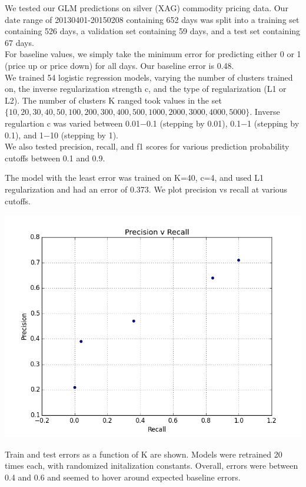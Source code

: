We tested our GLM predictions on silver (XAG) commodity pricing data. Our date range of 20130401-20150208 containing 652 days was split into a training set containing 526 days, a validation set containing 59 days, and a test set containing 67 days.\\

For baseline values, we simply take the minimum error for predicting either 0 or 1 (price up or price down) for all days. Our baseline error is 0.48.\\

We trained 54 logistic regression models, varying the number of clusters trained on, the inverse regularization strength c, and the type of regularization (L1 or L2). The number of clusters K ranged took values in the set $\{10,20,30,40,50,100,200,300,400,500,1000,2000,3000,4000,5000\}$. Inverse regulartion c was varied between 0.01−0.1 (stepping by 0.01), 0.1−1 (stepping by 0.1), and 1−10 (stepping by 1).\\

We also tested precision, recall, and f1 scores for various prediction probability cutoffs between 0.1 and 0.9.

The model with the least error was trained on K=40, c=4, and used L1 regularization and had an error of 0.373. We plot precision vs recall at various cutoffs. 

\includegraphics{images/precision_v_recall.png}

Train and test errors as a function of K are shown. Models were retrained 20 times each, with randomized initalization constants. Overall, errors were between 0.4 and 0.6 and seemed to hover around expected baseline errors. 

